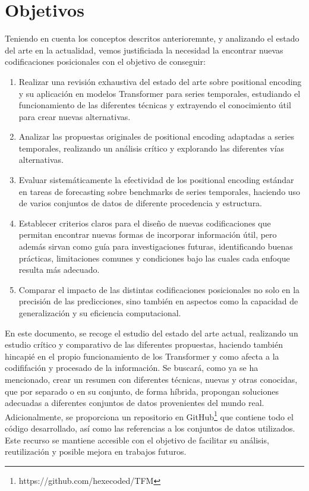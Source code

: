 \section{Objetivos}

Teniendo en cuenta los conceptos descritos anterioremnte, y analizando el estado del arte en la actualidad, vemos justificiada la necesidad la encontrar nuevas codificaciones posicionales con el objetivo de conseguir:

\begin{enumerate}
	\item Realizar una revisión exhaustiva del estado del arte sobre positional encoding y su aplicación en modelos Transformer para series temporales, estudiando el funcionamiento de las diferentes técnicas y extrayendo el conocimiento útil para crear nuevas alternativas.
	
	\item Analizar las propuestas originales de positional encoding adaptadas a series temporales, realizando un análisis crítico y explorando las diferentes vías alternativas.
	
	\item Evaluar sistemáticamente la efectividad de los positional encoding estándar en tareas de forecasting sobre benchmarks de series temporales, haciendo uso de varios conjuntos de datos de diferente procedencia y estructura.
	
	\item Establecer criterios claros para el diseño de nuevas codificaciones que permitan encontrar nuevas formas de incorporar información útil, pero además sirvan como guía para investigaciones futuras, identificando buenas prácticas, limitaciones comunes y condiciones bajo las cuales cada enfoque resulta más adecuado.
	
	\item Comparar el impacto de las distintas codificaciones posicionales no solo en la precisión de las predicciones, sino también en aspectos como la capacidad de generalización y su eficiencia computacional.

\end{enumerate}

En este documento, se recoge el estudio del estado del arte actual, realizando un estudio crítico y comparativo de las diferentes propuestas, haciendo también hincapié en el propio funcionamiento de los Transformer y como afecta a la codififación y procesado de la información. Se buscará, como ya se ha mencionado, crear un resumen con diferentes técnicas, nuevas y otras conocidas, que por separado o en su conjunto, de forma híbrida, propongan soluciones adecuadas a diferentes conjuntos de datos provenientes del mundo real.\\

Adicionalmente, se proporciona un repositorio en GitHub\footnote{https://github.com/hexecoded/TFM} que contiene todo el código desarrollado, así como las referencias a los conjuntos de datos utilizados. Este recurso se mantiene accesible con el objetivo de facilitar su análisis, reutilización y posible mejora en trabajos futuros.